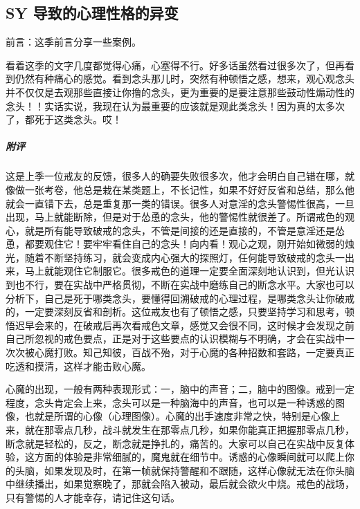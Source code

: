 \subsection{SY 导致的心理性格的异变}

前言：这季前言分享一些案例。

\begin{case}
    看着这季的文字几度都觉得心痛，心塞得不行。好多话虽然看过很多次了，但再看到仍然有种痛心的感觉。看到念头那儿时，突然有种顿悟之感，想来，观心观念头并不仅仅是去观那些直接让你撸的念头，更为重要的是要注意那些鼓动性煽动性的念头！！实话实说，我现在认为最重要的应该就是观此类念头！因为真的太多次了，都死于这类念头。哎！
    \subparagraph{附评} 这是上季一位戒友的反馈，很多人的确要失败很多次，他才会明白自己错在哪，就像做一张考卷，他总是栽在某类题上，不长记性，如果不好好反省和总结，那么他就会一直错下去，总是重复那一类的错误。很多人对意淫的念头警惕性很高，一旦出现，马上就能断除，但是对于怂恿的念头，他的警惕性就很差了。所谓戒色的观心，就是所有能导致破戒的念头，不管是间接的还是直接的，不管是意淫还是怂恿，都要观住它！要牢牢看住自己的念头！向内看！观心之观，刚开始如微弱的烛光，随着不断坚持练习，就会变成内心强大的探照灯，任何能导致破戒的念头一出来，马上就能观住它制服它。很多戒色的道理一定要全面深刻地认识到，但光认识到也不行，要在实战中严格贯彻，不断在实战中磨练自己的断念水平。大家也可以分析下，自己是死于哪类念头，要懂得回溯破戒的心理过程，是哪类念头让你破戒的，一定要深刻反省和剖析。这位戒友也有了顿悟之感，只要坚持学习和思考，顿悟迟早会来的，在破戒后再次看戒色文章，感觉又会很不同，这时候才会发现之前自己所忽视的戒色要点，正是对于这些要点的认识模糊与不明确，才会在实战中一次次被心魔打败。知己知彼，百战不殆，对于心魔的各种招数和套路，一定要真正吃透和摸清，这样才能击败心魔。

    心魔的出现，一般有两种表现形式：一，脑中的声音；二，脑中的图像。戒到一定程度，念头肯定会上来，念头可以是一种脑海中的声音，也可以是一种诱惑的图像，也就是所谓的心像（心理图像）。心魔的出手速度非常之快，特别是心像上来，就在那零点几秒，战斗就发生在那零点几秒，如果你能真正把握那零点几秒，断念就是轻松的，反之，断念就是挣扎的，痛苦的。大家可以自己在实战中反复体验，这方面的体验是非常细腻的，魔鬼就在细节中。诱惑的心像瞬间就可以爬上你的头脑，如果发现及时，在第一帧就保持警醒和不跟随，这样心像就无法在你头脑中继续播出，如果觉察晚了，那就会陷入被动，最后就会欲火中烧。戒色的战场，只有警惕的人才能幸存，请记住这句话。
\end{case}

